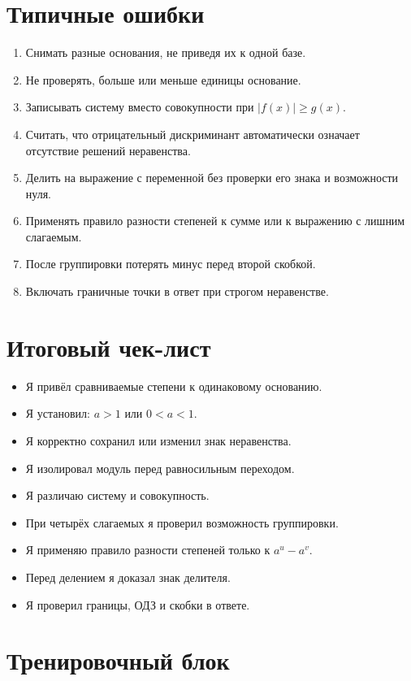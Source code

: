 \documentclass[a4paper,12pt]{article}
\begin{document}
{\small{}
\section{Типичные ошибки}

\begin{enumerate}
  \item Снимать разные основания, не приведя их к одной базе.
  \item Не проверять, больше или меньше единицы основание.
  \item Записывать систему вместо совокупности при $|f(x)|\ge g(x)$.
  \item Считать, что отрицательный дискриминант автоматически означает отсутствие решений неравенства.
  \item Делить на выражение с переменной без проверки его знака и возможности нуля.
  \item Применять правило разности степеней к сумме или к выражению с лишним слагаемым.
  \item После группировки потерять минус перед второй скобкой.
  \item Включать граничные точки в ответ при строгом неравенстве.
\end{enumerate}

\section{Итоговый чек-лист}

\begin{itemize}[label=$\square$,itemsep=1pt]
  \item Я привёл сравниваемые степени к одинаковому основанию.
  \item Я установил: $a>1$ или $0<a<1$.
  \item Я корректно сохранил или изменил знак неравенства.
  \item Я изолировал модуль перед равносильным переходом.
  \item Я различаю систему и совокупность.
  \item При четырёх слагаемых я проверил возможность группировки.
  \item Я применяю правило разности степеней только к $a^u-a^v$.
  \item Перед делением я доказал знак делителя.
  \item Я проверил границы, ОДЗ и скобки в ответе.
\end{itemize}
}

\newpage
\section{Тренировочный блок}
\end{document}
